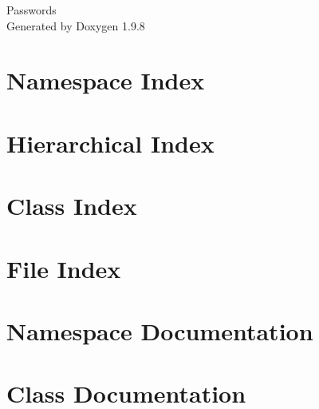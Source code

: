 \documentclass[twoside]{book}
\newcommand{\+}{\discretionary{\mbox{\scriptsize$\hookleftarrow$}}{}{}}
\newcommand{\clearemptydoublepage}{%
    \newpage{\pagestyle{empty}\cleardoublepage}%
  }
\begin{document}
  \raggedbottom
    \hypersetup{pageanchor=false,
                bookmarksnumbered=true,
                pdfencoding=unicode
               }
  \begin{titlepage}
  \vspace*{7cm}
  \begin{center}%
  {\Large Passwords}\\
  \vspace*{1cm}
  {\large Generated by Doxygen 1.9.8}\\
  \end{center}
  \end{titlepage}
  \clearemptydoublepage
  \tableofcontents
  \clearemptydoublepage
  \hypersetup{pageanchor=true}


\chapter{Namespace Index}

\chapter{Hierarchical Index}

\chapter{Class Index}

\chapter{File Index}

\chapter{Namespace Documentation}





\chapter{Class Documentation}






























\end{document}
